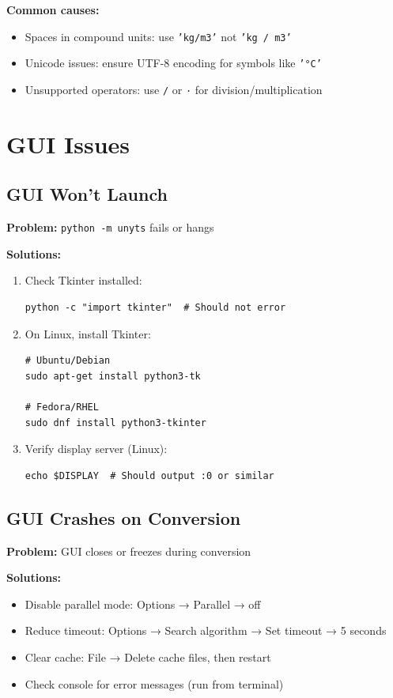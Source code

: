 \documentclass[11pt,a4paper]{report}
\begin{document}
\textbf{Common causes:}
\begin{itemize}
\item Spaces in compound units: use \texttt{'kg/m3'} not \texttt{'kg / m3'}
\item Unicode issues: ensure UTF-8 encoding for symbols like \texttt{'°C'}
\item Unsupported operators: use \texttt{/} or \texttt{·} for division/multiplication
\end{itemize}

\section{GUI Issues}

\subsection{GUI Won't Launch}

\textbf{Problem:} \texttt{python -m unyts} fails or hangs

\textbf{Solutions:}
\begin{enumerate}
\item Check Tkinter installed:
\begin{lstlisting}[style=pythonstyle]
python -c "import tkinter"  # Should not error
\end{lstlisting}

\item On Linux, install Tkinter:
\begin{lstlisting}[style=pythonstyle]
# Ubuntu/Debian
sudo apt-get install python3-tk

# Fedora/RHEL
sudo dnf install python3-tkinter
\end{lstlisting}

\item Verify display server (Linux):
\begin{lstlisting}[style=pythonstyle]
echo $DISPLAY  # Should output :0 or similar
\end{lstlisting}
\end{enumerate}

\subsection{GUI Crashes on Conversion}

\textbf{Problem:} GUI closes or freezes during conversion

\textbf{Solutions:}
\begin{itemize}
\item Disable parallel mode: Options → Parallel → off
\item Reduce timeout: Options → Search algorithm → Set timeout → 5 seconds
\item Clear cache: File → Delete cache files, then restart
\item Check console for error messages (run from terminal)
\end{itemize}
\end{document}
